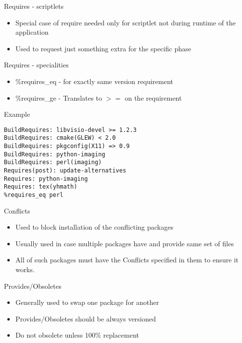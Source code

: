 \documentclass{beamer}
\begin{document}
\begin{frame}[t]{Requires - scriptlets}
	\begin{itemize}
	\item Special case of require needed only for scriptlet not during runtime of the application
    \item Used to request just something extra for the specific phase
	\end{itemize}
\end{frame}

\begin{frame}[t]{Requires - specialities}
	\begin{itemize}
    \item \%requires\_eq - for exactly same version requirement
    \item  \%requires\_ge - Translates to $>=$ on the requirement
	\end{itemize}
\end{frame}

\begin{frame}[fragile]{Example}
	\begin{small}
	\begin{verbatim}
BuildRequires: libvisio-devel >= 1.2.3
BuildRequires: cmake(GLEW) < 2.0
BuildRequires: pkgconfig(X11) => 0.9
BuildRequires: python-imaging
BuildRequires: perl(imaging)
Requires(post): update-alternatives
Requires: python-imaging
Requires: tex(yhmath)
%requires_eq perl
	\end{verbatim}
	\end{small}
\end{frame}

\begin{frame}[t]{Conflicts}
	\begin{itemize}
    \item Used to block installation of the conflicting packages
    \item Usually used in case multiple packages have and provide same set of files
    \item All of such packages must have the Conflicts specified in them to ensure it works.
	\end{itemize}
\end{frame}

\begin{frame}[t]{Provides/Obsoletes}
	\begin{itemize}
	\item Generally used to swap one package for another
    \item Provides/Obsoletes should be always versioned
    \item Do not obsolete unless 100\% replacement
	\end{itemize}
\end{frame}
\end{document}
